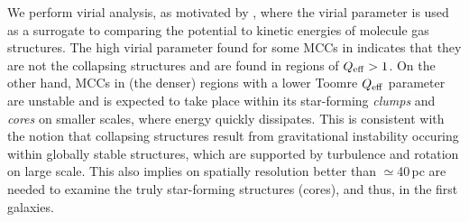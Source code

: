 \IfFileExists{emulateapjlegacy.cls}{\documentclass[iop]{emulateapjlegacy}}{\documentclass[iop]{emulateapj}}
\begin{document}
We perform virial analysis, as motivated by \obs, where the virial parameter is used as a surrogate to comparing the potential to kinetic energies of 
molecule gas structures. The high virial parameter found for some MCCs in \flower 
indicates that they are not the collapsing structures and are found in regions of $Q_{\rm eff}>1$.
On the other hand, MCCs in (the denser) regions with a lower Toomre $Q_{\rm eff}$ parameter are unstable
and \SF is expected to take place within its star-forming {\it clumps} and {\it cores} on smaller scales, 
where energy quickly dissipates. %
This is consistent with the notion that collapsing structures result from
gravitational instability occuring within globally stable structures, which are
supported by turbulence and rotation on large scale.
This also implies \obs on spatially resolution better than $\simeq$40\,pc are needed to examine the truly star-forming structures (cores),
and thus, \SF in the first galaxies.
\end{document}
